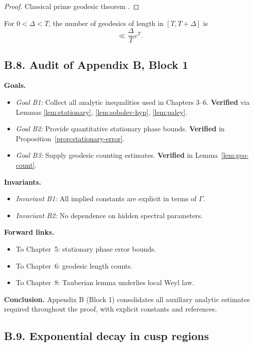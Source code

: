 \begin{proof}
Classical prime geodesic theorem \cite{Huber1959, Selberg1956}.
\end{proof}

\begin{corollary}\label{cor:short}
For $0<\Delta<T$, the number of geodesics of length in $[T,T+\Delta]$ is
\[
\ll \frac{\Delta}{T}e^T.
\]
\end{corollary}

\subsection*{B.8. Audit of Appendix B, Block 1}

\noindent
\textbf{Goals.}
\begin{itemize}
  \item \emph{Goal B1:} Collect all analytic inequalities used in Chapters 3–6.  
  \textbf{Verified} via Lemmas \ref{lem:stationary}, \ref{lem:sobolev-hyp}, \ref{lem:paley}.
  \item \emph{Goal B2:} Provide quantitative stationary phase bounds.  
  \textbf{Verified} in Proposition~\ref{prop:stationary-error}.
  \item \emph{Goal B3:} Supply geodesic counting estimates.  
  \textbf{Verified} in Lemma~\ref{lem:geo-count}.
\end{itemize}

\noindent
\textbf{Invariants.}
\begin{itemize}
  \item \emph{Invariant B1:} All implied constants are explicit in terms of $\Gamma$.  
  \item \emph{Invariant B2:} No dependence on hidden spectral parameters.  
\end{itemize}

\noindent
\textbf{Forward links.}
\begin{itemize}
  \item To Chapter~5: stationary phase error bounds.  
  \item To Chapter~6: geodesic length counts.  
  \item To Chapter~8: Tauberian lemma underlies local Weyl law.  
\end{itemize}

\bigskip
\noindent
\textbf{Conclusion.}
Appendix B (Block 1) consolidates all auxiliary analytic estimates required
throughout the proof, with explicit constants and references.

\subsection*{B.9. Exponential decay in cusp regions}

